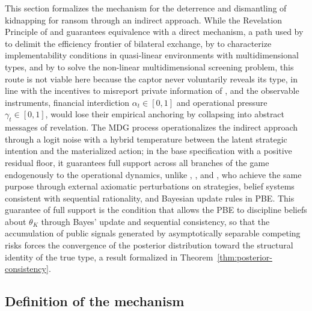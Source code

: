 \documentclass[review,authoryear,12pt]{elsarticle}
\theoremstyle{plain}
\theoremstyle{definition}
\newcommand{\1}{\mathbf{1}}
\begin{document}
This section formalizes the mechanism for the deterrence and dismantling of kidnapping for ransom through an indirect approach. While the Revelation Principle of \citet{Gibbard1973} and \citet{Myerson1979IC,Myerson1981} guarantees equivalence with a direct mechanism, a path used by \citet{MyersonSatterthwaite1983} to delimit the efficiency frontier of bilateral exchange, by \citet{Rochet1987} to characterize implementability conditions in quasi-linear environments with multidimensional types, and by \citet{RochetChone1998} to solve the non-linear multidimensional screening problem, this route is not viable here because the captor never voluntarily reveals its type, in line with the incentives to misreport private information of \citet{Fearon1995Rationalist}, and the observable instruments, financial interdiction $\alpha_t\in[0,1]$ and operational pressure $\gamma_t\in[0,1]$, would lose their empirical anchoring by collapsing into abstract messages of revelation. The MDG process operationalizes the indirect approach through a logit noise with a hybrid temperature between the latent strategic intention and the materialized action; in the base specification with a positive residual floor, it guarantees full support across all branches of the game endogenously to the operational dynamics, unlike \citet{Selten1975Perfectness}, \citet{KrepsWilson1982}, and \citet{FudenbergTirole1991}, who achieve the same purpose through external axiomatic perturbations on strategies, belief systems consistent with sequential rationality, and Bayesian update rules in PBE. This guarantee of full support is the condition that allows the PBE to discipline beliefs about $\theta_K$ through Bayes' update and sequential consistency, so that the accumulation of public signals generated by asymptotically separable competing risks forces the convergence of the posterior distribution toward the structural identity of the true type, a result formalized in Theorem~\ref{thm:posterior-consistency}.

\subsection{Definition of the mechanism}\label{subsec:def-mecanismo}
\end{document}

